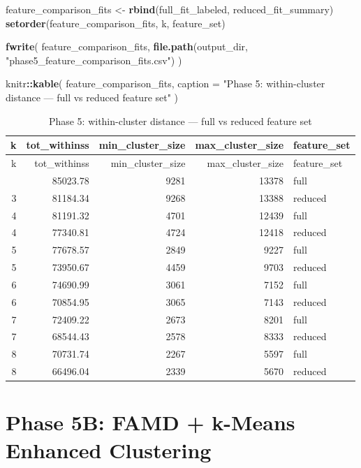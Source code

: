 \documentclass[
]{article}
\newenvironment{Shaded}{\begin{snugshade}}{\end{snugshade}}
\newcommand{\AttributeTok}[1]{\textcolor[rgb]{0.13,0.29,0.53}{#1}}
\newcommand{\FunctionTok}[1]{\textcolor[rgb]{0.13,0.29,0.53}{\textbf{#1}}}
\newcommand{\NormalTok}[1]{#1}
\newcommand{\OtherTok}[1]{\textcolor[rgb]{0.56,0.35,0.01}{#1}}
\newcommand{\SpecialCharTok}[1]{\textcolor[rgb]{0.81,0.36,0.00}{\textbf{#1}}}
\newcommand{\StringTok}[1]{\textcolor[rgb]{0.31,0.60,0.02}{#1}}
\begin{document}
\begin{Shaded}
\begin{Highlighting}[]
\NormalTok{feature\_comparison\_fits }\OtherTok{\textless{}{-}} \FunctionTok{rbind}\NormalTok{(full\_fit\_labeled, reduced\_fit\_summary)}
\FunctionTok{setorder}\NormalTok{(feature\_comparison\_fits, k, feature\_set)}

\FunctionTok{fwrite}\NormalTok{(}
\NormalTok{  feature\_comparison\_fits,}
  \FunctionTok{file.path}\NormalTok{(output\_dir, }\StringTok{"phase5\_feature\_comparison\_fits.csv"}\NormalTok{)}
\NormalTok{)}

\NormalTok{knitr}\SpecialCharTok{::}\FunctionTok{kable}\NormalTok{(}
\NormalTok{  feature\_comparison\_fits,}
  \AttributeTok{caption =} \StringTok{"Phase 5: within{-}cluster distance — full vs reduced feature set"}
\NormalTok{)}
\end{Highlighting}
\end{Shaded}

\begin{longtable}[]{@{}rrrrl@{}}
\caption{Phase 5: within-cluster distance --- full vs reduced feature
set}\tabularnewline
\toprule\noalign{}
k & tot\_withinss & min\_cluster\_size & max\_cluster\_size &
feature\_set \\
\midrule\noalign{}
\endfirsthead
\toprule\noalign{}
k & tot\_withinss & min\_cluster\_size & max\_cluster\_size &
feature\_set \\
\midrule\noalign{}
\endhead
\bottomrule\noalign{}
\endlastfoot
3 & 85023.78 & 9281 & 13378 & full \\
3 & 81184.34 & 9268 & 13388 & reduced \\
4 & 81191.32 & 4701 & 12439 & full \\
4 & 77340.81 & 4724 & 12418 & reduced \\
5 & 77678.57 & 2849 & 9227 & full \\
5 & 73950.67 & 4459 & 9703 & reduced \\
6 & 74690.99 & 3061 & 7152 & full \\
6 & 70854.95 & 3065 & 7143 & reduced \\
7 & 72409.22 & 2673 & 8201 & full \\
7 & 68544.43 & 2578 & 8333 & reduced \\
8 & 70731.74 & 2267 & 5597 & full \\
8 & 66496.04 & 2339 & 5670 & reduced \\
\end{longtable}

\section{Phase 5B: FAMD + k-Means Enhanced
Clustering}\label{phase-5b-famd-k-means-enhanced-clustering}
\end{document}
